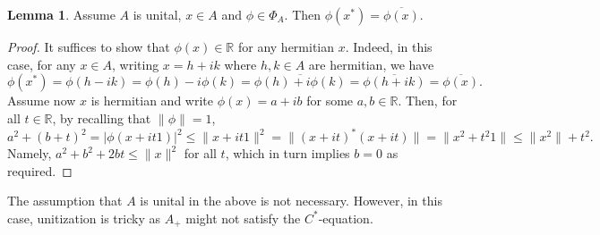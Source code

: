 \documentclass[]{article}
\theoremstyle{definition}
\newtheorem{lemma}{Lemma}[section]
\begin{document}
\begin{lemma}
  Assume \(A\) is unital, \(x \in A\) and \(\phi \in \Phi_A\). Then \(\phi(x^*) = \overline{\phi(x)}\).
\end{lemma}
\begin{proof}
  It suffices to show that \(\phi(x) \in \mathbb{R}\) for any hermitian \(x\). Indeed, in this case, 
  for any \(x \in A\), writing \(x = h + ik\) where \(h, k \in A\) are hermitian, we have 
  \[\phi(x^*) = \phi(h - ik) = \phi(h) - i \phi(k) = \overline{\phi(h) + i\phi(k)} 
    = \overline{\phi(h + ik)} = \overline{\phi(x)}.\]
  Assume now \(x\) is hermitian and write \(\phi(x) = a + ib\) for some \(a, b \in \mathbb{R}\). Then, 
  for all \(t \in \mathbb{R}\), by recalling that \(\|\phi\| = 1\),
  \[a^2 + (b + t)^2 = |\phi(x + it1)|^2 \le \|x + it1\|^2 = \|(x + it)^*(x + it)\| = \|x^2 + t^2 1\| 
  \le \|x^2\| + t^2.\]
  Namely, \(a^2 + b^2 + 2bt \le \|x\|^2\) for all \(t\), which in turn implies \(b = 0\) as required. 
\end{proof}

The assumption that \(A\) is unital in the above is not necessary. However, in this case, unitization 
is tricky as \(A_+\) might not satisfy the \(C^*\)-equation.
\end{document}
